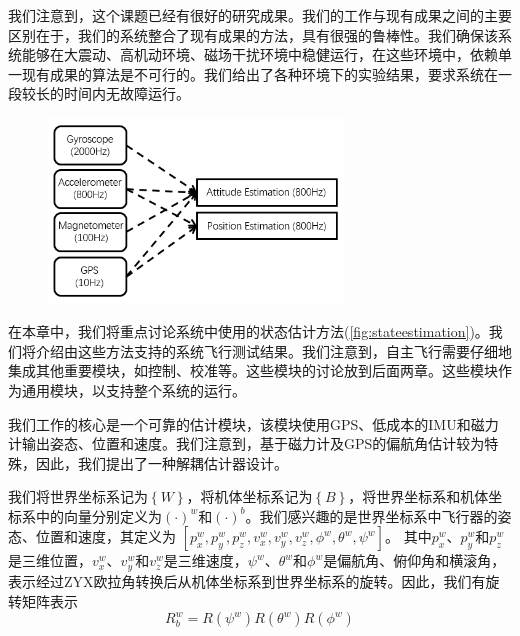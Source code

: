 \documentclass[
  type=master
]{gdutthesis}
\begin{document}
我们注意到，这个课题已经有很好的研究成果\cite{mahony2008nonlinear,hua2010attitude,khosravian2016state}。我们的工作与现有成果之间的主要区别在于，我们的系统整合了现有成果的方法，具有很强的鲁棒性。我们确保该系统能够在大震动、高机动环境、磁场干扰环境中稳健运行，在这些环境中，依赖单一现有成果的算法是不可行的。我们给出了各种环境下的实验结果，要求系统在一段较长的时间内无故障运行。
\begin{figure}[htbp]
	\centering
	\includegraphics[width=0.7\textwidth]{state estimation.png}
	\label{fig:stateestimation}
\end{figure} 

在本章中，我们将重点讨论系统中使用的状态估计方法(\autoref{fig:stateestimation})。我们将介绍由这些方法支持的系统飞行测试结果。我们注意到，自主飞行需要仔细地集成其他重要模块，如控制、校准等。这些模块的讨论放到后面两章。这些模块作为通用模块，以支持整个系统的运行。

我们工作的核心是一个可靠的估计模块，该模块使用GPS、低成本的IMU和磁力计输出姿态、位置和速度。我们注意到，基于磁力计及GPS的偏航角估计较为特殊，因此，我们提出了一种解耦估计器设计。

我们将世界坐标系记为$\left\{ W \right\}$，将机体坐标系记为$\left\{ B \right\}$，将世界坐标系和机体坐标系中的向量分别定义为$(\cdot)^w$和$(\cdot)^b$。我们感兴趣的是世界坐标系中飞行器的姿态、位置和速度，其定义为
$[p^w_x , p^w_y , p^w_z , v^w_x , v^w_y , v^w_z , \phi^w , \theta^w , \psi^w]$。
其中$p^w_x$、$p^w_y$和$p^w_z$是三维位置，$v^w_x$、$v^w_y$和$v^w_z$是三维速度，$\psi^w$、$\theta^w$和$\phi^w$是偏航角、俯仰角和横滚角，表示经过ZYX欧拉角转换后从机体坐标系到世界坐标系的旋转。因此，我们有旋转矩阵表示
\begin{equation}\label{eq:rotationmatrix}
	R_{b}^{w}=R(\psi^w)R(\theta^w)R(\phi^w)
\end{equation}
\end{document}
